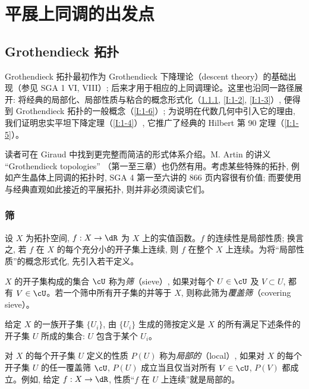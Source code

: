 
\chapter[{平展上同调的出发点 [Arcata]}]{平展上同调的出发点}\label{I}



\section{Grothendieck 拓扑}\label{I:1}

Grothendieck 拓扑最初作为 Grothendieck 下降理论（descent theory）的基础出现（参见 SGA 1 VI, VIII）; 后来才用于相应的上同调理论。这里也沿同一路径展开: 将经典的局部化、局部性质与粘合的概念形式化（\ref{I:1-1}, \ref{I:1-2}, \ref{I:1-3}）, 便得到 Grothendieck 拓扑的一般概念（\ref{I:1-6}）; 为说明在代数几何中引入它的理由, 我们证明忠实平坦下降定理（\ref{I:1-4}）, 它推广了经典的 Hilbert 第 90 定理（\ref{I:1-5}）。

读者可在 Giraud \cite{gi64} 中找到更完整而简洁的形式体系介绍。M. Artin 的讲义 “Grothendieck topologies” \cite{ar62}（第一至三章）也仍然有用。考虑某些特殊的拓扑, 例如产生晶体上同调的拓扑时, SGA 4 第一至六讲的 866 页内容很有价值; 而要使用与经典直观如此接近的平展拓扑, 则并非必须阅读它们。

\subsection{筛}\label{I:1-1}

设 $X$ 为拓扑空间, $f:X\to \dR$ 为 $X$ 上的实值函数。$f$ 的连续性是局部性质; 换言之, 若 $f$ 在 $X$ 的每个充分小的开子集上连续, 则 $f$ 在整个 $X$ 上连续。为将“局部性质”的概念形式化, 先引入若干定义。

$X$ 的开子集构成的集合 $\cU$ 称为\emph{筛}（sieve）, 如果对每个 $U\in\cU$ 及 $V\subset U$, 都有 $V\in\cU$。若一个筛中所有开子集的并等于 $X$, 则称此筛为\emph{覆盖筛}（covering sieve）。

给定 $X$ 的一族开子集 $\{U_i\}$, 由 $\{U_i\}$ 生成的筛按定义是 $X$ 的所有满足下述条件的开子集 $U$ 所成的集合: $U$ 包含于某个 $U_i$。

对 $X$ 的每个开子集 $U$ 定义的性质 $P(U)$ 称为\emph{局部的}（local）, 如果对 $X$ 的每个开子集 $U$ 的任一覆盖筛 $\cU$, $P(U)$ 成立当且仅当对所有 $V\in \cU$, $P(V)$ 都成立。例如, 给定 $f:X\to \dR$, 性质“$f$ 在 $U$ 上连续”就是局部的。

